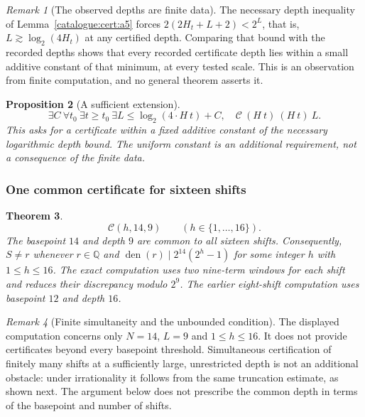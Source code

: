 \documentclass[11pt]{article}
\theoremstyle{plain}
\newtheorem{thm}{Theorem}[section]
\newtheorem{prop}[thm]{Proposition}
\theoremstyle{definition}
\theoremstyle{remark}
\newtheorem{rem}[thm]{Remark}
\begin{document}
\begin{rem}[The observed depths are finite data]
The necessary depth inequality of Lemma~\ref{catalogue:cert:a5} forces
$2(2H_t{+}L{+}2)<2^L$, that is, $L \gtrsim \log_2(4H_t)$ at any certified
depth. Comparing that bound with the recorded depths shows that every
recorded certificate depth lies within a small additive constant of that
minimum, at every tested scale. This is an observation from finite
computation, and no general theorem asserts it.
\end{rem}

\begin{prop}[A sufficient extension]\label{prop:sufficient-extension-2}
\[
  \exists C\ \forall t_0\ \exists t\ge t_0\ \exists L\le \log_2(4\cdot{H}\ t)+C,\quad
  \mathcal{C}\ ({H}\ t)\ ({H}\ t)\ L .
\]
This asks for a certificate within a fixed additive constant of the
necessary logarithmic depth bound. The uniform constant is an additional
requirement, not a consequence of the finite data.
\end{prop}

\subsubsection{One common certificate for sixteen shifts}

\begin{thm}\label{thm:one-common-certificate-sixteen-shifts}
\[
  \mathcal C(h,14,9)\qquad(h\in\{1,\ldots,16\}).
\]
The basepoint $14$ and depth $9$ are common to all sixteen shifts.
Consequently, $S\ne r$ whenever $r\in\mathbb Q$ and
$\operatorname{den}(r)\mid2^{14}(2^h-1)$ for some integer $h$ with
$1\le h\le16$. The exact computation uses two nine-term windows for
each shift and reduces their discrepancy modulo $2^9$. The earlier
eight-shift computation uses basepoint $12$ and depth $16$.
\end{thm}

\begin{rem}[Finite simultaneity and the unbounded condition]
The displayed computation concerns only $N=14$, $L=9$ and
$1\le h\le16$. It does not provide certificates beyond every basepoint
threshold. Simultaneous certification of finitely many shifts at a
sufficiently large, unrestricted depth is not an additional obstacle:
under irrationality it follows from the same truncation estimate, as
shown next. The argument below does not prescribe the common depth in terms of
the basepoint and number of shifts.
\end{rem}
\end{document}

